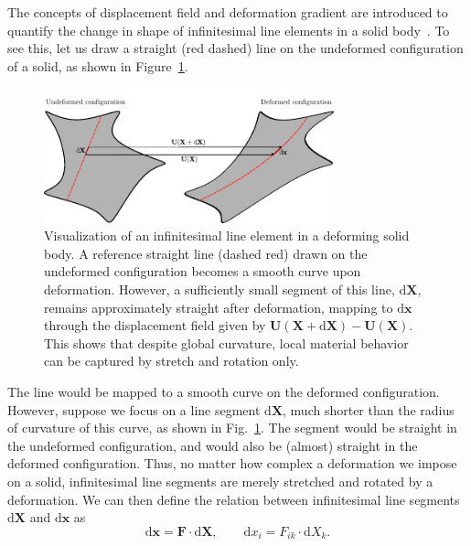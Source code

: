 \documentclass[a4paper,11pt]{article}
\begin{document}
The concepts of displacement field and deformation gradient are introduced to quantify the change in shape of infinitesimal line elements in a solid body~\cite{bonet1997nonlinear}. To see this, let us draw a straight (red dashed) line on the undeformed configuration of a solid, as shown in Figure~\ref{fig:dx}.
\begin{figure}[H]
\centering
\includegraphics[width=0.75\textwidth]{images/dx.pdf}
\caption{Visualization of an infinitesimal line element in a deforming solid body. A reference straight line (dashed red) drawn on the undeformed configuration becomes a smooth curve upon deformation. However, a sufficiently small segment of this line, $\text{d}\mathbf{X}$, remains approximately straight after deformation, mapping to $\text{d}\mathbf{x}$ through the displacement field given by $\mathbf{U}(\mathbf{X}+\text{d}\mathbf{X})-\mathbf{U}(\mathbf{X})$. This shows that despite global curvature, local material behavior can be captured by stretch and rotation only.}
\label{fig:dx}
\end{figure}
The line would be mapped to a smooth curve on the deformed configuration. However, suppose we focus on a line segment $\text{d}\mathbf{X}$, much shorter than the radius of curvature of this curve, as shown in Fig.~\ref{fig:dx}.  The segment would be straight in the undeformed configuration, and would also be (almost) straight in the deformed configuration.  Thus, no matter how complex a deformation we impose on a solid, infinitesimal line segments are merely stretched and rotated by a deformation. We can then define the relation between infinitesimal line segments $\text{d}\mathbf{X}$ and $\text{d}\mathbf{x}$ as
\begin{equation}
\text{d}\mathbf{x}=\mathbf{F}\cdot \text{d}\mathbf{X}, \qquad \text{d}x_i=F_{ik}\cdot \text{d}X_k.
\end{equation}
\end{document}
